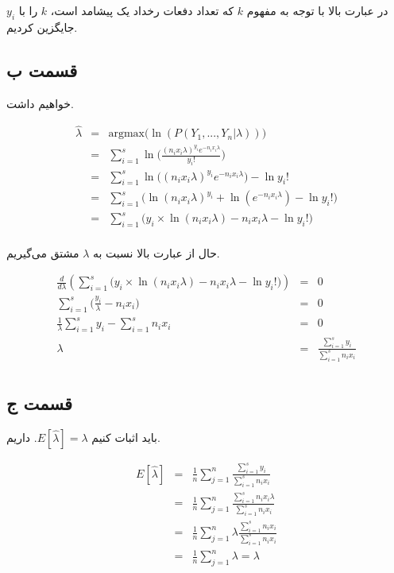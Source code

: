 \documentclass{article}
\begin{document}
در عبارت بالا با توجه به مفهوم $k$ که تعداد دفعات رخداد یک پیشامد است، $k$ را با $y_i$ جایگزین کردیم.

\subsection*{قسمت ب}

خواهیم داشت.

\begin{eqnarray*}
    \hat{\lambda} & = & \text{argmax}\Big(\ln(P(Y_1, ..., Y_n|\lambda))\Big) \\
    & = & \sum_{i=1}^{s} \ln\Big(\frac{(n_ix_i\lambda)^{y_i}e^{-n_ix_i\lambda}}{y_i!}\Big) \\
    & = & \sum_{i=1}^{s} \ln\big((n_ix_i\lambda)^{y_i}e^{-n_ix_i\lambda}\big) - \ln y_i! \\
    & = & \sum_{i=1}^{s} \Big( \ln(n_ix_i\lambda)^{y_i} + \ln (e^{-n_ix_i\lambda}) - \ln y_i! \Big)\\
    & = & \sum_{i=1}^{s} \Big( y_i \times \ln(n_ix_i\lambda) - n_ix_i\lambda - \ln y_i! \Big) \\
\end{eqnarray*}

حال از عبارت بالا نسبت به $\lambda$ مشتق می‌گیریم.

\begin{eqnarray*}
    \frac{d}{d \lambda}(\sum_{i=1}^{s} \Big( y_i \times \ln(n_ix_i\lambda) - n_ix_i\lambda - \ln y_i! \Big)) & = & 0\\
    \sum_{i=1}^{s} \Big( \frac{y_i}{\lambda} - n_ix_i \Big) & = &  0\\
    \frac{1}{\lambda} \sum_{i=1}^{s} y_i - \sum_{i=1}^{s} n_ix_i & = & 0 \\
    \lambda & = & \frac{\sum_{i=1}^{s} y_i}{\sum_{i=1}^{s} n_ix_i} \\
\end{eqnarray*}

\subsection*{قسمت ج}

باید اثبات کنیم $E[\hat{\lambda}] = \lambda$. داریم.

\begin{eqnarray*}
    E[\hat{\lambda}] & = & \frac{1}{n} \sum_{j=1}^{n} \frac{\sum_{i=1}^{s} y_i}{\sum_{i=1}^{s} n_ix_i} \\
    & = & \frac{1}{n} \sum_{j=1}^{n} \frac{\sum_{i=1}^{s} n_ix_i \lambda}{\sum_{i=1}^{s} n_ix_i} \\
    & = & \frac{1}{n} \sum_{j=1}^{n} \lambda \frac{\sum_{i=1}^{s} n_ix_i }{\sum_{i=1}^{s} n_ix_i} \\
    & = & \frac{1}{n} \sum_{j=1}^{n} \lambda  = \lambda \\
\end{eqnarray*}
\end{document}
